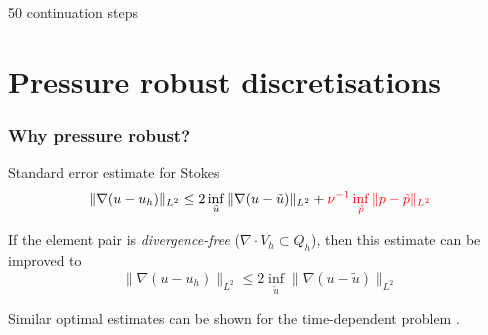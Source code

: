 \documentclass[presentation,aspectratio=43, 10pt]{beamer}
\begin{document}
\begin{frame}[t]
\begin{columns}
\begin{column}{0.5\textwidth}
\begin{center}
    \end{center}
    \end{column}
  \end{columns}
  \begin{center}
    50 continuation steps
  \end{center}
\end{frame}

\section{Pressure robust discretisations}

\begin{frame}
  \frametitle{Why pressure robust?}
  Standard error estimate for Stokes \parencite{John:2017}
  \begin{equation*}
    \|\nabla(u - u_h)\|_{L^2} \le 2 \inf_{\tilde{u}}\|\nabla(u - \tilde{u})\|_{L^2} + \textcolor{red}{\nu^{-1} \inf_{\tilde{p}} \|p - \tilde{p}\|_{L^2}}
  \end{equation*}

  If the element pair is \emph{divergence-free} ($\nabla \cdot V_h \subset Q_h$), then this estimate can be improved to
  \begin{equation*}
    \|\nabla(u - u_h)\|_{L^2} \le 2 \inf_{\tilde{u}}\|\nabla(u - \tilde{u})\|_{L^2}    
  \end{equation*}

  Similar optimal estimates can be shown for the time-dependent problem \parencite{Linke:2019}.
\end{frame}
\end{document}
